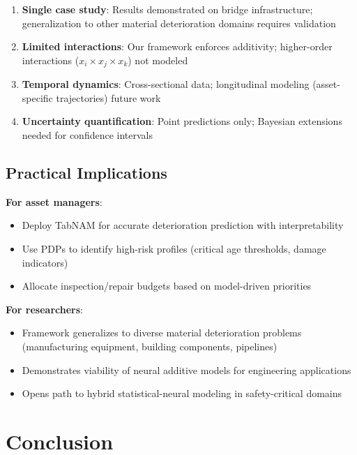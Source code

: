 \documentclass[twocolumn]{article}
\begin{document}
\begin{enumerate}
\item \textbf{Single case study}: Results demonstrated on bridge infrastructure; generalization to other material deterioration domains requires validation
\item \textbf{Limited interactions}: Our framework enforces additivity; higher-order interactions ($x_i \times x_j \times x_k$) not modeled
\item \textbf{Temporal dynamics}: Cross-sectional data; longitudinal modeling (asset-specific trajectories) future work
\item \textbf{Uncertainty quantification}: Point predictions only; Bayesian extensions needed for confidence intervals
\end{enumerate}

\subsection{Practical Implications}

\textbf{For asset managers}:
\begin{itemize}
\item Deploy TabNAM for accurate deterioration prediction with interpretability
\item Use PDPs to identify high-risk profiles (critical age thresholds, damage indicators)
\item Allocate inspection/repair budgets based on model-driven priorities
\end{itemize}

\textbf{For researchers}:
\begin{itemize}
\item Framework generalizes to diverse material deterioration problems (manufacturing equipment, building components, pipelines)
\item Demonstrates viability of neural additive models for engineering applications
\item Opens path to hybrid statistical-neural modeling in safety-critical domains
\end{itemize}

\section{Conclusion}
\label{sec:conclusion}
\end{document}
